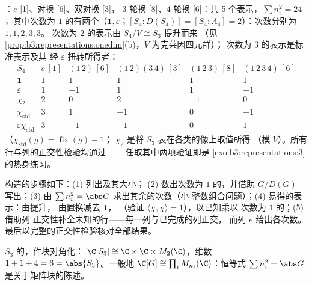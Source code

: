 \begin{example}[$S_4$ 的特征标表]\label{ex:b3:representations:s4}
：$e$ [1]、对换 [6]、双对换 [3]，
$3$-轮换 [8]、$4$-轮换 [6]：共 5 个表示，$\sum n_i^2 =
24$，其中次数为 $1$ 的有两个（$\mathbf 1, \varepsilon$；$[S_4 :
D(S_4)] = [S_4 : A_4] = 2$）：次数分别为 $1, 1, 2, 3, 3$。
次数为 $2$ 的表示由 $S_4/V \cong S_3$ 提升而来
（见\cref{prop:b3:representations:onedim}(b)，$V$ 为克莱因四元群）；
次数为 $3$ 的表示是标准表示及其
经 $\varepsilon$ 扭转所得者：
\[
\begin{array}{c|ccccc}
S_4 & e\,[1] & (1\,2)\,[6] & (1\,2)(3\,4)\,[3] &
(1\,2\,3)\,[8] & (1\,2\,3\,4)\,[6]\\
\hline
\mathbf 1 & 1 & 1 & 1 & 1 & 1\\
\varepsilon & 1 & -1 & 1 & 1 & -1\\
\chi_2 & 2 & 0 & 2 & -1 & 0\\
\chi_{\mathrm{std}} & 3 & 1 & -1 & 0 & -1\\
\varepsilon\chi_{\mathrm{std}} & 3 & -1 & -1 & 0 & 1
\end{array}
\]
（$\chi_{\mathrm{std}}(g) = \operatorname{fix}(g) - 1$；
$\chi_2$ 是将 $S_3$ 表在各类的像上取值所得
（模 $V$）。所有行与列的正交性检验均通过——
任取其中两项验证即是 \cref{exo:b3:representations:3} 的热身练习。
\end{example}

\begin{method}\label{met:b3:representations:table}
构造的步骤如下：(1) 列出及其大小；
(2) 数出次数为 $1$ 的，并借助 $G/D(G)$ 写出；(3)
由 $\sum n_i^2 = \abs G$ 求出其余的次数（小
整数组合问题）；(4) 易得的表示：由提升，
由置换减去 $\mathbf 1$，
（验证 $\langle\chi,\chi\rangle = 1$），以已知乘以
次数为 $1$ 的；(5) 借助列
正交性补全未知的行——每一列与已完成的列正交，
而列 $e$ 给出各次数。
最后以完整的正交性检验核对全部结果。
\end{method}

\begin{omfigure}

{\small $S_3$ 的，作块对角化：
$\C[S_3] \cong \C \times \C \times M_2(\C)$，维数 $1 + 1 +
4 = 6 = \abs{S_3}$。一般地 $\C[G] \cong \prod_i
M_{n_i}(\C)$：恒等式 $\sum n_i^2 = \abs G$
是关于矩阵块的陈述。}
\end{omfigure}


